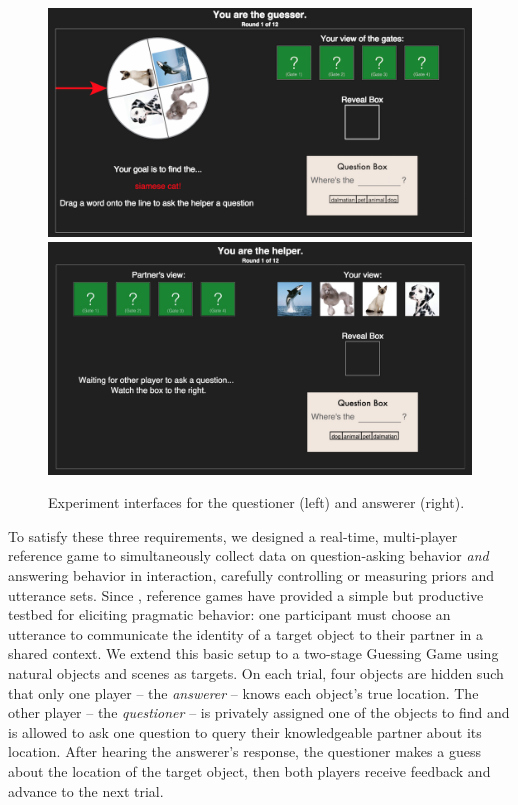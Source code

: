\documentclass[12pt, floatsintext, jou]{apa6}
\begin{document}
\begin{figure}[t!]
\begin{center}
\includegraphics[scale = .213]{Exp4GuesserViewStart}
\includegraphics[scale = .105]{Exp4HelperViewStart}
\end{center}
\caption{Experiment interfaces for the questioner (left) and answerer (right).}
\label{fig:expviews}
\end{figure}



To satisfy these three requirements, we designed a real-time, multi-player reference game to simultaneously collect data on question-asking behavior \emph{and} answering behavior in interaction, carefully controlling or measuring priors and utterance sets. Since , reference games have provided a simple but productive testbed for eliciting pragmatic behavior: one participant must choose an utterance to communicate the identity of a target object to their partner in a shared context. We extend this basic setup to a two-stage Guessing Game using natural objects and scenes as targets. On each trial, four objects are hidden such that only one player -- the \emph{answerer} -- knows each object's true location. The other player -- the \emph{questioner} -- is privately assigned one of the objects to find and is allowed to ask one question to query their knowledgeable partner about its location. After hearing the answerer's response, the questioner makes a guess about the location of the target object, then both players receive feedback and advance to the next trial. 
\end{document}
